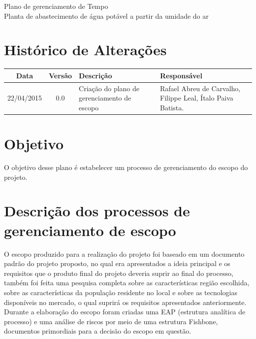% 
% 
% 
\begin{center}
 {\large Plano de gerenciamento de Tempo}\\[0.2cm]
 {Planta de abastecimento de água potável a partir da umidade do ar}\\
 \end{center}
 
 \section{Histórico de Alterações}
\begin{table}[h]
\centering
\begin{tabular}{|c|c|p{6cm}|p{5cm}|}

Data & Versão & Descrição & Responsável\\
\hline                               
22/04/2015 & 0.0 & Criação do plano de gerenciamento de escopo & Rafael Abreu de Carvalho, Filippe Leal, Ítalo Paiva Batista. \\
\hline
\end{tabular}
\end{table}

\section{Objetivo}
O objetivo desse plano é estabelecer um processo de gerenciamento do escopo do projeto.

\section{Descrição dos processos de gerenciamento de escopo}
O escopo produzido para a realização do projeto foi baseado em um documento padrão do projeto proposto, no qual era apresentados a ideia principal e os requisitos que o produto final do projeto deveria suprir ao final do processo, também foi feita uma pesquisa completa sobre as características região escolhida, sobre as características da população residente no local e sobre as tecnologias disponíveis no mercado, o qual suprirá os requisitos apresentados anteriormente. Durante a elaboração do escopo foram criadas uma EAP (estrutura analítica de processo) e uma análise de riscos por meio de uma estrutura Fishbone, documentos primordiais para a decisão do escopo em questão.


